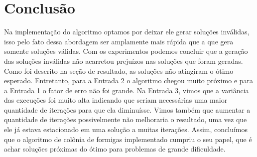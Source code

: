 \documentclass[a4paper, 12pt]{article}
\begin{document}
\section{Conclusão}
Na implementação do algoritmo optamos por deixar ele gerar soluções inválidas, isso pelo fato dessa abordagem ser amplamente mais rápida que a que gera somente soluções válidas. Com os experimentos podemos concluir que a geração das soluções inválidas não acarretou prejuízos nas soluções que foram geradas. Como foi descrito na seção de resultado, as soluções não atingiram o ótimo esperado. Entretanto, para a Entrada 2 o algoritmo chegou muito próximo e para a Entrada 1 o fator de erro não foi grande. Na Entrada 3, vimos que a variância das execuções foi muito alta indicando que seriam necessárias uma maior quantidade de iterações para que ela diminuísse. Vimos também que aumentar a quantidade de iterações possivelmente não melhoraria o resultado, uma vez que ele já estava estacionado em uma solução a muitas iterações. Assim, concluímos que o algoritmo de colônia de formigas implementado cumpriu o seu papel, que é achar soluções próximas do ótimo para problemas de grande dificuldade.  
\end{document}
